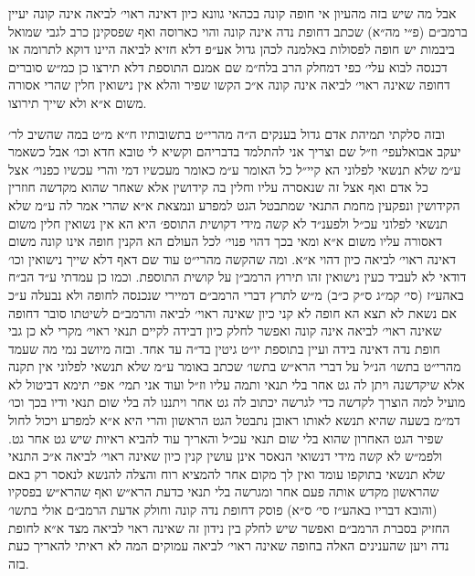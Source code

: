 \documentclass[12pt, openany]{book}
\begin{document}
\begin{multicols}{2}
אבל מה שיש בזה מהעיון אי חופה קונה בכהאי גוונא כיון דאינה ראוי׳ לביאה אינה קונה יעיין ברמב״ם (פ״י מה״א) שכתב דחופת נדה אינה קונה והוי כארוסה ואף שפסקינן כרב לגבי שמואל ביבמות יש חופה לפסולות באלמנה לכהן גדול אע״פ דלא חזיא לביאה היינו דוקא לתרומה או דכנסה לבוא עלי׳ כפי דמחלק הרב בלח״מ שם אמנם התוספת דלא תירצו כן כמ״ש סוברים דחופה שאינה ראוי׳ לביאה אינה קונה א״כ הקשו שפיר והלא אין נישואין חלין שהרי אסורה משום א״א ולא שייך תירוצו.\\\vspace{0pt}

ובזה סלקתי תמיהת אדם גדול בענקים ה״ה מהרי״ט בתשובותיו ח״א מ״ט במה שהשיב לר׳ יעקב אבואלעפי׳ וז״ל שם וצריך אני להתלמד בדבריהם וקשיא לי טובא חדא וכו׳ אבל כשאמר ע״מ שלא תנשאי לפלוני הא קיי״ל כל האומר ע״מ כאומר מעכשיו דמי והרי עכשיו כפנוי׳ אצל כל אדם ואף אצל זה שנאסרה עליו וחלין בה קידושין אלא שאחר שהוא מקדשה חוזרין הקידושין ונפקעין מחמת התנאי שמתבטל הגט למפרע ונמצאת א״א שהרי אמר לה ע״מ שלא תנשאי לפלוני עכ״ל ולפענ״ד לא קשה מידי דקושית התוספ׳ היא הא אין נשואין חלין משום דאסורה עליו משום א״א ומאי בכך דהוי פנוי׳ לכל העולם הא הקנין חופה אינו קונה משום דאינה ראוי׳ לביאה כיון דהוי א״א. ומה שהקשה מהרי״ט עוד שם דאף דלא שייך נישואין וכו׳ דודאי לא לעביד כעין נישואין זהו תירוץ הרמב״ן על קושית התוספת. וכמו כן עמדתי ע״ד הב״ח באהע״ז (סי׳ קמ״ג ס״ק כ״ב) מ״ש לתרץ דברי הרמב״ם דמיירי שנכנסה לחופה ולא נבעלה ע״כ אם נשאת לא תצא הא חופה לא קני כיון שאינה ראוי׳ לביאה והרמב״ם לשיטתו סובר דחופה שאינה ראוי׳ לביאה אינה קונה ואפשר לחלק כיון דבידה לקיים תנאי ראוי׳ מקרי לא כן גבי חופת נדה דאינה בידה ועיין בתוספת יו״ט גיטין בד״ה עד אחד. ובזה מיושב נמי מה שעמד מהרי״ט בתשו׳ הנ״ל על דברי הרא״ש בתשו׳ שכתב באומר ע״מ שלא תנשאי לפלוני אין תקנה אלא שיקדשנה ויתן לה גט אחר בלי תנאי ותמה עליו וז״ל ועוד אני תמי׳ אפי׳ תימא דביטול לא מועיל למה הוצרך לקדשה כדי לגרשה יכתוב לה גט אחר ויתננו לה בלי שום תנאי ודיו בכך וכו׳ דמ״מ בשעה שהיא תנשא לאותו ראובן נתבטל הגט הראשון והרי היא א״א למפרע ויכול לחול שפיר הגט האחרון שהוא בלי שום תנאי עכ״ל והאריך עוד להביא ראיות שיש גט אחר גט. ולפמ״ש לא קשה מידי דנשואי הנאסר אינן עושין קנין כיון שאינה ראוי׳ לביאה א״כ התנאי שלא תנשאי בתוקפו עומד ואין לך מקום אחר להמציא רוח והצלה להנשא לנאסר רק באם שהראשון מקדש אותה פעם אחר ומגרשה בלי תנאי כדעת הרא״ש ואף שהרא״ש בפסקיו (והובא דבריו באהע״ז סי׳ ס״א) פוסק דחופת נדה קונה וחולק אדעת הרמב״ם אולי בתשו׳ החזיק בסברת הרמב״ם ואפשר שיש לחלק בין נידון זה שאינה ראוי לביאה מצד א״א לחופת נדה ויען שהענינים האלה בחופה שאינה ראוי׳ לביאה עמוקים המה לא ראיתי להאריך כעת בזה.\\\vspace{0pt}


\end{multicols}
\end{document}
